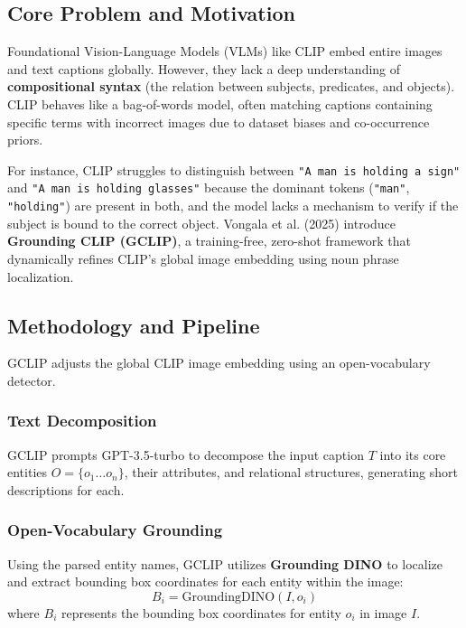 \documentclass[11pt,a4paper]{article}
\begin{document}
\subsection{Core Problem and Motivation}
Foundational Vision-Language Models (VLMs) like CLIP embed entire images and text captions globally. However, they lack a deep understanding of \textbf{compositional syntax} (the relation between subjects, predicates, and objects). CLIP behaves like a bag-of-words model, often matching captions containing specific terms with incorrect images due to dataset biases and co-occurrence priors. 

For instance, CLIP struggles to distinguish between \texttt{"A man is holding a sign"} and \texttt{"A man is holding glasses"} because the dominant tokens (\texttt{"man"}, \texttt{"holding"}) are present in both, and the model lacks a mechanism to verify if the subject is bound to the correct object. Vongala et al. (2025) introduce \textbf{Grounding CLIP (GCLIP)}, a training-free, zero-shot framework that dynamically refines CLIP's global image embedding using noun phrase localization.

\subsection{Methodology and Pipeline}
GCLIP adjusts the global CLIP image embedding using an open-vocabulary detector.

\subsubsection{Text Decomposition}
GCLIP prompts GPT-3.5-turbo to decompose the input caption $T$ into its core entities $O = \{o_1 \dots o_n\}$, their attributes, and relational structures, generating short descriptions for each.

\subsubsection{Open-Vocabulary Grounding}
Using the parsed entity names, GCLIP utilizes \textbf{Grounding DINO} to localize and extract bounding box coordinates for each entity within the image:
\begin{equation}
B_i = \text{GroundingDINO}(I, o_i)
\end{equation}
where $B_i$ represents the bounding box coordinates for entity $o_i$ in image $I$.
\end{document}
